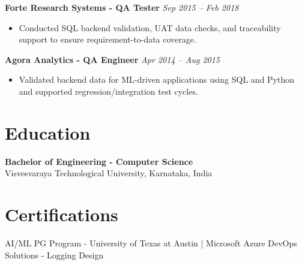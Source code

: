 \documentclass[10pt,letterpaper]{article}
\newcommand{\roleline}[2]{
  \textbf{#1} \hfill \textit{#2} \\[-4pt]
}
\begin{document}
\roleline{Forte Research Systems - QA Tester}{Sep 2015 -- Feb 2018}
\begin{itemize}
  \item Conducted SQL backend validation, UAT data checks, and traceability support to ensure requirement-to-data coverage.
\end{itemize}

\roleline{Agora Analytics - QA Engineer}{Apr 2014 -- Aug 2015}
\begin{itemize}
  \item Validated backend data for ML-driven applications using SQL and Python and supported regression/integration test cycles.
\end{itemize}

\section*{Education}
\textbf{Bachelor of Engineering - Computer Science} \\
Visvesvaraya Technological University, Karnataka, India

\section*{Certifications}
AI/ML PG Program - University of Texas at Austin \;|\; Microsoft Azure DevOps Solutions - Logging Design
\end{document}
